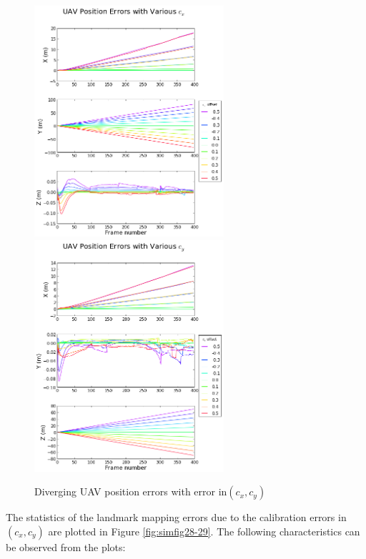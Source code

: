 \begin{figure}[h]
  \centering
  \includegraphics[width=7cm,keepaspectratio=true]{./Figures/SimulationFigures/Figure36.png}
  \includegraphics[width=7cm,keepaspectratio=true]{./Figures/SimulationFigures/Figure37.png}
  \caption{Diverging UAV position errors with error in$(c_x, c_y)$ }
  \label{fig:simfig36-37}
\end{figure}
\FloatBarrier

The statistics of the landmark mapping errors due to the calibration
errors in $(c_{x}, c_{y})$ are plotted in Figure
\ref{fig:simfig28-29}. The following characteristics can be observed
from the plots:

